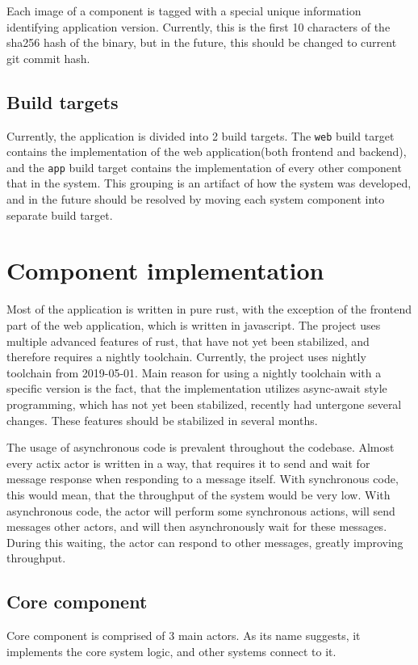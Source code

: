 Each image of a component is tagged with a special unique information identifying application version. Currently,
this is the first 10 characters of the sha256 hash of the binary, but in the future, this should be changed to current
git commit hash.

\subsection{Build targets}
Currently, the application is divided into 2 build targets. The \verb|web| build target contains the implementation
of the web application(both frontend and backend), and the \verb|app| build target contains the implementation
of every other component that in the system. This grouping is an artifact of how the system was developed, and in the
future should be resolved by moving each system component into separate build target.

\section{Component implementation}
Most of the application is written in pure rust, with the exception of the frontend part of the web application, which
is written in javascript. The project uses multiple advanced features of rust, that have not yet been stabilized, and
therefore requires a nightly toolchain. Currently, the project uses nightly toolchain from 2019-05-01. Main
reason for using a nightly toolchain with a specific version is the fact, that the implementation utilizes
async-await style programming, which has not yet been stabilized, recently had untergone
several changes. These features should be stabilized in several months.

The usage of asynchronous code is prevalent throughout the codebase. Almost every actix actor is written in a way, that requires
it to send and wait for message response when responding to a message itself. With synchronous code, this would mean, that
the throughput of the system would be very low. With asynchronous code, the actor will perform some synchronous actions,
will send messages other actors, and will then asynchronously wait for these messages. During this waiting, the actor
can respond to other messages, greatly improving throughput.

\subsection{Core component}
Core component is comprised of 3 main actors. As its name suggests, it implements the core system logic, and
other systems connect to it.

